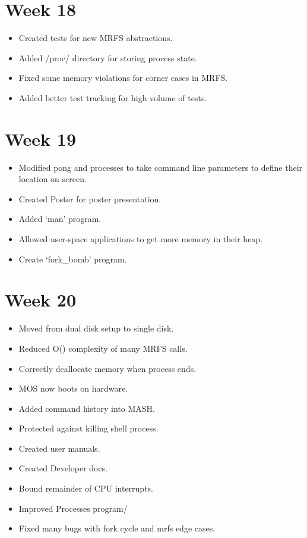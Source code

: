 \documentclass[a4paper]{report}
\begin{document}
\section*{Week 18}
\begin{itemize}
\item Created tests for new MRFS abstractions.
\item Added /proc/ directory for storing process state.
\item Fixed some memory violations for corner cases in MRFS.
\item Added better test tracking for high volume of tests.
\end{itemize}

\section*{Week 19}
\begin{itemize}
\item Modified pong and processes to take command line parameters to define their location on screen.
\item Created Poster for poster presentation.
\item Added `man' program.
\item Allowed user-space applications to get more memory in their heap.
\item Create `fork\_bomb' program.
\end{itemize}

\section*{Week 20}
\begin{itemize}
\item Moved from dual disk setup to single disk.
\item Reduced O() complexity of many MRFS calls.
\item Correctly deallocate memory when process ends.
\item MOS now boots on hardware.
\item Added command history into MASH.
\item Protected against killing shell process.
\item Created user manuals.
\item Created Developer docs.
\item Bound remainder of CPU interrupts.
\item Improved Processes program/
\item Fixed many bugs with fork cycle and mrfs edge cases.
\end{itemize}
\end{document}
